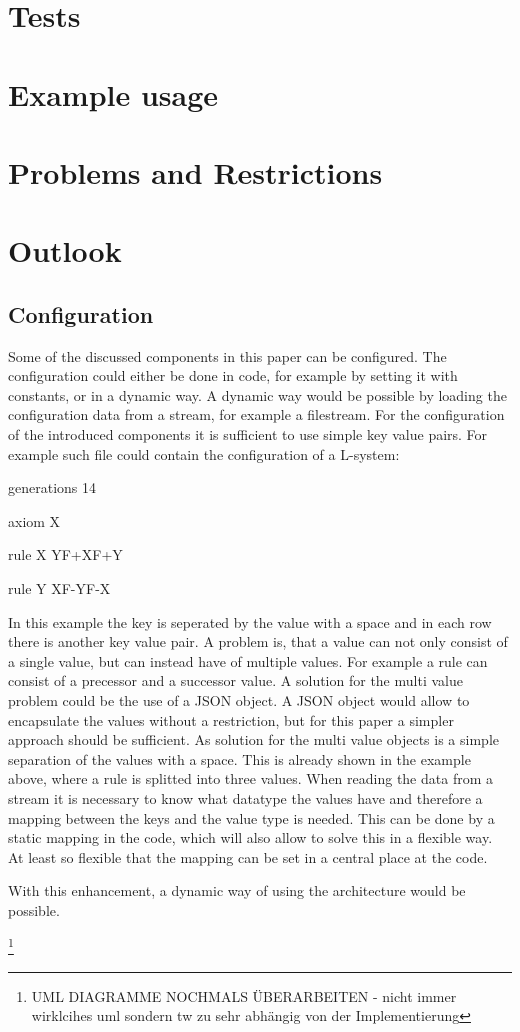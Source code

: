 \documentclass[english]{cpp-hmwk}
\begin{document}
\section{Tests}
\section{Example usage}
\section{Problems and Restrictions}
\section{Outlook}



\subsection{Configuration}
Some of the discussed components in this paper can be configured. The configuration could either be done in code, for example by setting it with constants, or in a dynamic way. A dynamic way would be possible by loading the configuration data from a stream, for example a filestream.
For the configuration of the introduced components it is sufficient to use simple key value pairs. For example such file could contain the configuration of a L-system:

\medskip

generations 14

axiom X

rule X YF+XF+Y

rule Y XF-YF-X

\medskip

\noindent In this example the key is seperated by the value with a space and in each row there is another key value pair. A problem is, that a value can not only consist of a single value, but can instead have of multiple values. For example a rule can consist of a precessor and a successor value. 
A solution for the multi value problem could be the use of a JSON object. A JSON object would allow to encapsulate the values without a restriction, but for this paper a simpler approach should be sufficient. As solution for the multi value objects is a simple separation of the values with a space. This is already shown in the example above, where a rule is splitted into three values.
When reading the data from a stream it is necessary to know what datatype the values have and therefore a mapping between the keys and the value type is needed. This can be done by a static mapping in the code, which will also allow to solve this in a flexible way. At least so flexible that the mapping can be set in a central place at the code.

With this enhancement, a dynamic way of using the architecture would be possible.


\footnote{UML DIAGRAMME NOCHMALS ÜBERARBEITEN - nicht immer wirklcihes uml sondern tw zu sehr abhängig von der Implementierung}

\printbibliography
\end{document}
